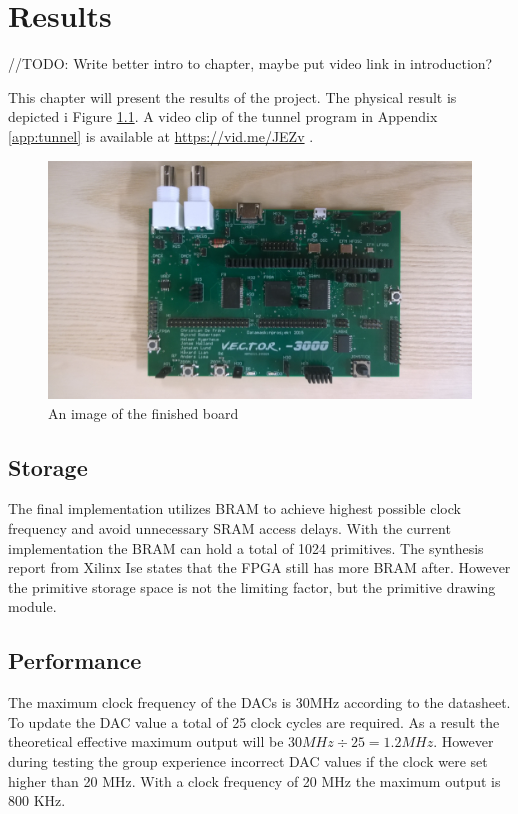 \chapter{Results}
//TODO: Write better intro to chapter, maybe put video link in introduction?

This chapter will present the results of the project. The physical result is depicted i Figure \ref{fig:board}.
A video clip of the tunnel program in Appendix \ref{app:tunnel} is available at \href{https://vid.me/JEZv}{https://vid.me/JEZv} \cite{tunnel-demo}.

\begin{figure}[h!]
	    \includegraphics[width=\linewidth, angle=180]{images/board.jpg}
	    \caption{An image of the finished \vthreek board}
	    \label{fig:board}
\end{figure}

\section{Storage}
The final implementation utilizes BRAM to achieve highest possible clock frequency and avoid unnecessary SRAM access delays.
With the current implementation the BRAM can hold a total of 1024 primitives.
The synthesis report from Xilinx Ise states that the FPGA still has more BRAM after.
However the primitive storage space is not the limiting factor, but the primitive drawing module.

\section{Performance}
The maximum clock frequency of the DACs is 30MHz according to the datasheet.
To update the DAC value a total of 25 clock cycles are required.
As a result the theoretical effective maximum output will be \(30 MHz \div 25 = 1.2 MHz \).
However during testing the group experience incorrect DAC values if the clock were set higher than 20 MHz.
With a clock frequency of 20 MHz the maximum output is 800 KHz.

